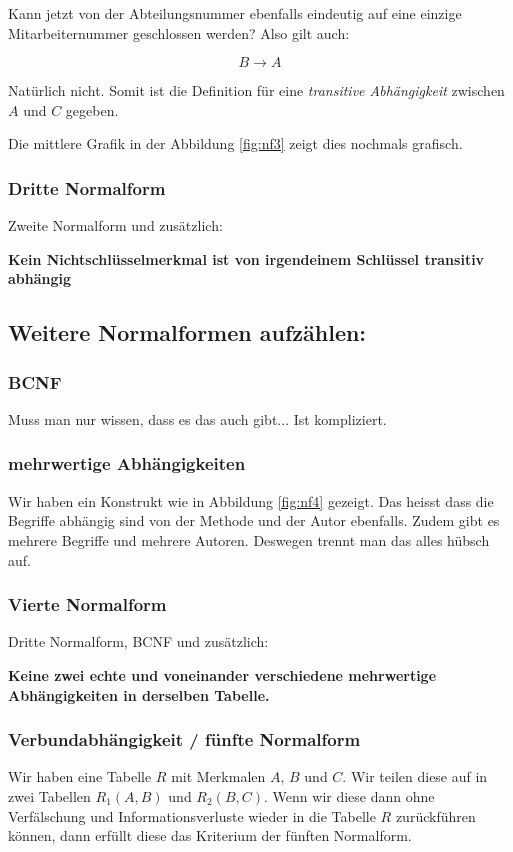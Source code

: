 Kann jetzt von der Abteilungsnummer ebenfalls eindeutig auf eine einzige Mitarbeiternummer geschlossen werden? Also gilt auch:

\begin{equation*}
    B\rightarrow A
\end{equation*}

Natürlich nicht. Somit ist die Definition für eine \emph{transitive Abhängigkeit} zwischen \(A\) und \(C\) gegeben.

Die mittlere Grafik in der Abbildung \ref{fig:nf3} zeigt dies nochmals grafisch.

\subsubsection{Dritte Normalform}
Zweite Normalform und zusätzlich:

\begin{center}
    \textbf{Kein Nichtschlüsselmerkmal ist von irgendeinem Schlüssel transitiv abhängig}
\end{center}

\subsection{Weitere Normalformen aufzählen:}

\subsubsection{BCNF}
Muss man nur wissen, dass es das auch gibt... Ist kompliziert.

\subsubsection{mehrwertige Abhängigkeiten}


Wir haben ein Konstrukt wie in Abbildung \ref{fig:nf4} gezeigt. Das heisst dass die Begriffe abhängig sind von der Methode und der Autor ebenfalls. Zudem gibt es mehrere Begriffe und mehrere Autoren. Deswegen trennt man das alles hübsch auf.

\subsubsection{Vierte Normalform}

Dritte Normalform, BCNF und zusätzlich:

\begin{center}
    \textbf{Keine zwei echte und voneinander verschiedene mehrwertige Abhängigkeiten in derselben Tabelle.}
\end{center}

\subsubsection{Verbundabhängigkeit / fünfte Normalform}
Wir haben eine Tabelle \(R\) mit Merkmalen \(A\), \(B\) und \(C\). Wir teilen diese auf in zwei Tabellen \(R_{1}(A,B)\) und \(R_{2}(B,C)\). Wenn wir diese dann ohne Verfälschung und Informationsverluste wieder in die Tabelle \(R\) zurückführen können, dann erfüllt diese das Kriterium der fünften Normalform.